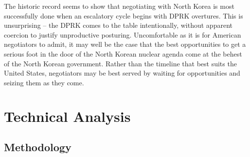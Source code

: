 \documentclass{article}
\begin{document}


The historic record seems to show that negotiating with North Korea is most successfully done when an escalatory cycle begins with DPRK overtures. This is unsurprising – the DPRK comes to the table intentionally, without apparent coercion to justify unproductive posturing. Uncomfortable as it is for American negotiators to admit, it may well be the case that the best opportunities to get a serious foot in the door of the North Korean nuclear agenda come at the behest of the North Korean government. Rather than the timeline that best suits the United States, negotiators may be best served by waiting for opportunities and seizing them as they come.

\section{Technical Analysis}


\subsection{Methodology}
\end{document}
